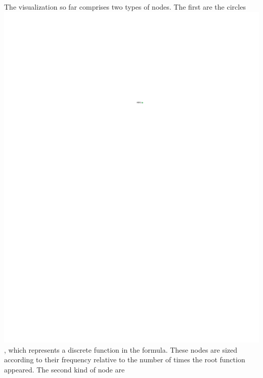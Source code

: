 \documentclass[conference]{IEEEtran}
\begin{document}
	The visualization so far comprises two types of nodes. The first are the
	circles \includegraphics{glossary-greenonly}, which represents a discrete
	function in the formula. These nodes are sized according to their frequency relative
	to the number of times the root function appeared. The second kind of node are
\end{document}
